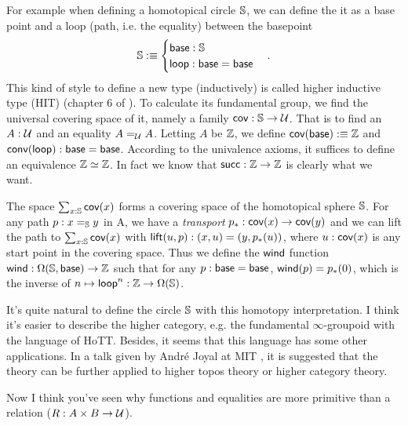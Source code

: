 For example when defining a homotopical circle $\mathbb{S}$, we can define 
the it as a base point and a loop (path, i.e. the equality) between the 
basepoint
\newcommand{\base}{\name{base}}
\newcommand{\nloop}{\name{loop}}
$$
    \sphere\defn\begin{cases}
        \base: \sphere \\
        \nloop: \base=\base \\
    \end{cases}.
$$
This kind of style to define a new type (inductively) is called higher
inductive type (HIT) (chapter 6 of \cite{homotopy-type-theory}).
To calculate its fundamental group, we find the universal covering space 
of it, namely a family $\text{\sf cov}:\mathbb{S}\to\mathcal{U}$. That is to
find an $A: \mathcal{U}$ and an equality $A=_{\mathcal{U}} A$. Letting $A$
be $\mathbb{Z}$, we define $\name{cov}(\base)\defn\integer$ and 
$\name{conv}(\nloop):\base=\base$. According to the univalence axioms,
it suffices to define an equivalence $\mathbb{Z}\simeq\mathbb{Z}$. In fact
we know that $\text{\sf succ}: \mathbb{Z}\to\mathbb{Z}$ is clearly what we want.

The space $\sum_{x:\mathbb{S}}\text{\sf cov}(x)$ forms a covering space of
the homotopical sphere $\mathbb{S}$. For any path $p:x=_{\mathbb{S}} y$ in A,
we have a {\it transport} $p_\ast:\text{\sf cov}(x)\to \text{\sf cov}(y)$ and
we can lift the path to $\sum_{x:\mathbb{S}}\text{\sf cov}(x)$ with
\newcommand{\lift}{\name{lift}}
$\lift(u,p):(x,u)=(y,p_\ast(u))$, where $u: \text{\sf cov}(x)$ is any
start point in the covering space. Thus we define the $\text{\sf wind}$
function $\name{wind}: \Omega(\sphere,\base)\to\integer$ such that
for any $p:\base=\base$, $\text{\sf wind}(p)=p_\ast(0)$, which is the
inverse of $n\mapsto \nloop^n: \integer\to\Omega(\sphere)$.

It's quite natural to define the circle $\mathbb{S}$ with this homotopy
interpretation. I think it's easier to describe the higher category,
e.g. the fundamental $\infty$-groupoid with the language of HoTT. 
Besides, it seems that this language has some other applications.
In a talk given by Andr\'e Joyal at MIT \cite{joyal2014categorical}, 
it is suggested that the theory can be further applied to higher topos 
theory or higher category theory.

Now I think you've seen why functions and equalities are more
primitive than a relation ($R:A\times B\to \mathcal{U}$).
